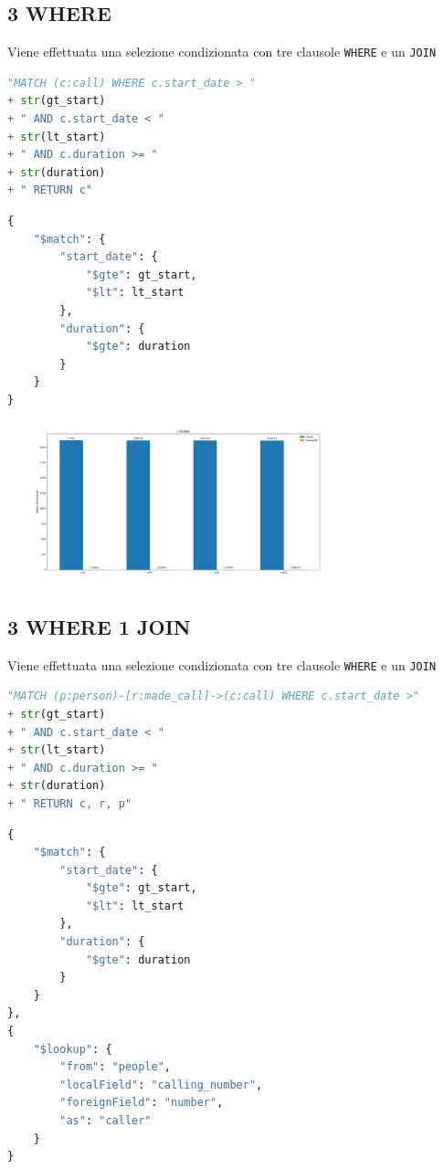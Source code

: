 \pagebreak
    \subsection{3 WHERE}
    Viene effettuata una selezione condizionata con tre clausole \texttt{WHERE}
    e un \texttt{JOIN}

    \begin{lstlisting}[language=Python, caption=Neo4j]
"MATCH (c:call) WHERE c.start_date > " 
+ str(gt_start) 
+ " AND c.start_date < " 
+ str(lt_start) 
+ " AND c.duration >= " 
+ str(duration) 
+ " RETURN c"

    \end{lstlisting}


    \begin{lstlisting}[language=Python, caption=MongoDB]
{
    "$match": {
        "start_date": {
            "$gte": gt_start,
            "$lt": lt_start
        },
        "duration": {
            "$gte": duration
        }
    }
}
    \end{lstlisting}
    
    \includegraphics[width=350px, keepaspectratio]{query2.png}

    \pagebreak
    \subsection{3 WHERE 1 JOIN}
    Viene effettuata una selezione condizionata con tre clausole \texttt{WHERE}
    e un \texttt{JOIN}

    \begin{lstlisting}[language=Python, caption=Neo4j]
"MATCH (p:person)-[r:made_call]->(c:call) WHERE c.start_date >" 
+ str(gt_start) 
+ " AND c.start_date < " 
+ str(lt_start) 
+ " AND c.duration >= " 
+ str(duration) 
+ " RETURN c, r, p"
    \end{lstlisting}


    \begin{lstlisting}[language=Python, caption=MongoDB]
{
    "$match": {
        "start_date": {
            "$gte": gt_start,
            "$lt": lt_start
        },
        "duration": {
            "$gte": duration
        }
    }
},
{
    "$lookup": {
        "from": "people",
        "localField": "calling_number",
        "foreignField": "number",
        "as": "caller"
    }
}
    \end{lstlisting}

